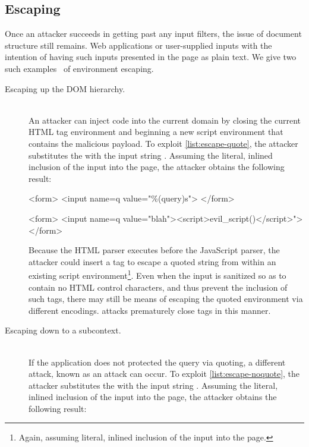\subsection{Escaping}\label{sec:escaping}
Once an attacker succeeds in getting past any input filters, the issue of document structure still remains.
Web applications  or  user-supplied inputs with the intention of having such inputs presented in the page as plain text.
We give two such examples~\cite{xss-filter-input} of environment escaping.

\begin{description}
 \item[Escaping up the DOM hierarchy.] \hfill \\
    An attacker can inject code into the current domain by closing the current HTML tag environment and beginning a new script environment that contains the malicious payload.
    To exploit \autoref{list:escape-quote}, the attacker substitutes the  with the input string .
    Assuming the literal, inlined inclusion of the input into the page, the attacker obtains the following result:

\begin{exploit-example}
  <form>
    <input name=q value="\%(query)s">
  </form>
\end{exploit-example}

\begin{exploit-example}
  <form>
    <input name=q value="blah"><script>evil_script()</script>">
  </form>
\end{exploit-example}

 Because the HTML parser executes before the JavaScript parser, the attacker could insert a  tag to escape a quoted string from within an existing script environment\footnote{Again, assuming literal, inlined inclusion of the input into the page.}.
Even when the input is sanitized so as to contain no HTML control characters, and thus prevent the inclusion of such tags, there may still be means of escaping the quoted environment via different encodings.
 attacks prematurely close tags in this manner.

 \item[Escaping down to a subcontext.] \hfill \\
   If the application does not protected the query via quoting, a different attack, known as an  attack can occur.
   To exploit \autoref{list:escape-noquote}, the attacker substitutes the  with the input string .
   Assuming the literal, inlined inclusion of the input into the page, the attacker obtains the following result:


\end{description}
